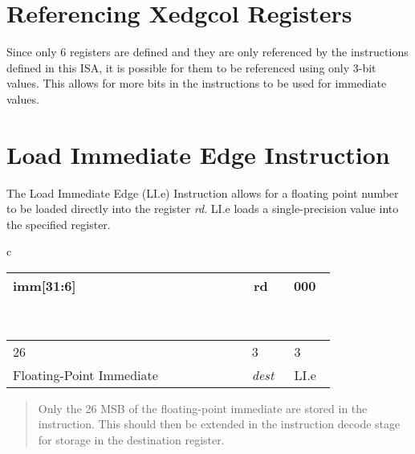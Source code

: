 \section{Referencing Xedgcol Registers}
Since only 6 registers are defined and they are only referenced by the instructions defined in this ISA, it is possible for them to be referenced using only 3-bit values. This allows for more bits in the instructions to be used for immediate values.

\section{Load Immediate Edge Instruction}
The Load Immediate Edge (LI.e) Instruction allows for a floating point number to be loaded directly into the register \textit{rd}. LI.e loads a single-precision value into the specified register.

\begin{table}[H]
\begin{center}
\begin{tabular}{c}
    \begin{tabular}{|m{0.6\linewidth}|m{0.1\linewidth}|m{0.1\linewidth}|}
    \hline
    \hspace*{3.5cm} imm[31:6]  &  \hspace*{0.5cm}rd &  \hspace*{0.5cm}000 \\
    \hline
    \end{tabular} \\

    \begin{tabular}{m{0.6\linewidth}m{0.1\linewidth}m{0.1\linewidth}}
    \hspace*{3.85cm}  26 &  \hspace*{0.5cm} 3 &  \hspace*{0.5cm} 3 \\
    \hspace*{2.7cm}  Floating-Point Immediate &  \hspace*{0.4cm}\textit{dest} &  \hspace*{0.4cm}LI.e \\
    \end{tabular}
\end{tabular}
\end{center}
\end{table}

\begin{quote}{}
    Only the 26 \gls{MSB} of the floating-point immediate are stored in the instruction. This should then be extended in the instruction decode stage for storage in the destination register.
\end{quote}

